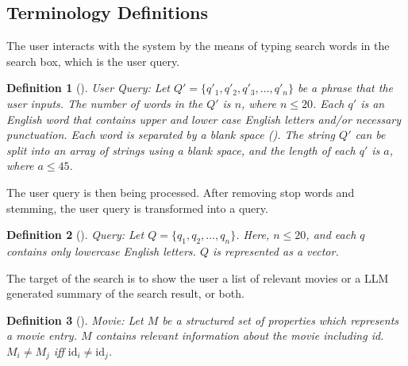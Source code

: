 \documentclass[journal]{IEEEtran}
\theoremstyle{mydefstyle}
\newtheorem{definition}{Definition}[section]
\begin{document}
\subsection{Terminology Definitions}
The user interacts with the system by the means of typing search words in the search box, which is the user query.

\begin{adjustwidth}{0.75cm}{}
\begin{definition}[]
    \textit{User Query:} Let \( Q' = \{q'_1, q'_2, q'_3, \ldots, q'_n\} \) be a phrase that the user inputs. The number of words in the \( Q' \) is \( n \), where \( n \leq 20 \). Each \( q' \) is an English word that contains upper and lower case English letters and/or necessary punctuation. Each word is separated by a blank space (\textvisiblespace). The string \( Q' \) can be split into an array of strings using a blank space, and the length of each \( q' \) is \( a \), where \( a \leq 45 \).

\end{definition}
\end{adjustwidth}

\vspace{10pt} 

The user query is then being processed. After removing stop words and stemming, the user query is transformed into a query.

\begin{adjustwidth}{0.75cm}{} \begin{definition}[]
\textit{Query:} Let \( Q = \{q_1, q_2, \ldots, q_n\} \). Here, \( n \leq 20 \), and each \( q \) contains only lowercase English letters. \( Q \) is represented as a vector.
\end{definition} \end{adjustwidth}

\vspace{10pt} 

The target of the search is to show the user a list of relevant movies or a LLM generated summary of the search result, or both. 

\begin{adjustwidth}{0.75cm}{} \begin{definition}[]
\textit{Movie:} Let \( M \) be a structured set of properties which represents a movie entry. \( M \) contains relevant information about the movie including id. \( M_i \neq M_j \) iff \( \text{id}_i \neq \text{id}_j \).
\end{definition} \end{adjustwidth}
\end{document}
